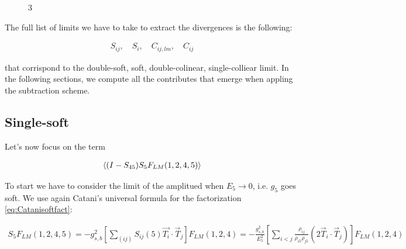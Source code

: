 \documentclass[11pt]{report}
\begin{document}
\begin{figure}
\begin{multicols}{3}
\begin{center}
        \end{center}
    \end{multicols}
\end{figure}

The full list of limits we have to take to extract the divergences is the following: 

\begin{align}
    S_{ij}, \quad S_i, \quad C_{ij, lm}, \quad C_{ij}
\end{align}

that corrispond to the double-soft, soft, double-colinear, single-colliear limit. In the following sections, we compute all the contributes that emerge when appling the subtraction scheme. 

\subsection{Single-soft}

Let's now focus on the term 

\begin{align}
    \braket{(I-S_{45})S_5 F_{LM}(1, 2, 4, 5)}
\end{align}

To start we have to consider the limit of the amplitued when \(E_5 \to 0\), i.e. \(g_5\) goes soft. We use again Catani's universal formula for the factorization \ref{eq:Catanisoftfact}: 

\begin{align}
    S_5 F_{LM}(1, 2, 4, 5) = -g^2_{s, b} \left[ \sum_{(ij)}S_{ij} (5) \vec{T_i} \cdot \vec{T}_j \right] F_{LM}(1, 2, 4) = -\frac{g_{s,b}^2}{E_5^2}\left[ \sum_{ i < j}\frac{\rho_{ij}}{\rho_{i5}\rho_{j5}} (2\vec{T}_i \cdot \vec{T}_j)\right]F_{LM}(1, 2, 4)
\end{align}
\end{document}
